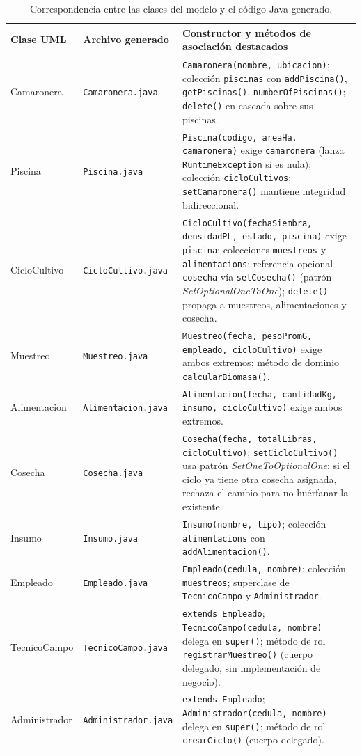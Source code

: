 \documentclass[11pt,a4paper]{article}
\begin{document}
\begin{table}[H]
  \centering
  \caption{Correspondencia entre las clases del modelo y el código Java generado.}
  \label{tab:correspondencia}
  \small
  \begin{tabular}{|l|l|p{6.3cm}|}
    \hline
    \textbf{Clase UML} & \textbf{Archivo generado} & \textbf{Constructor y métodos de asociación destacados} \\
    \hline
    Camaronera &
      \texttt{Camaronera.java} &
      \texttt{Camaronera(nombre, ubicacion)}; colección \texttt{piscinas} con \texttt{addPiscina()}, \texttt{getPiscinas()}, \texttt{numberOfPiscinas()}; \texttt{delete()} en cascada sobre sus piscinas. \\
    \hline
    Piscina &
      \texttt{Piscina.java} &
      \texttt{Piscina(codigo, areaHa, camaronera)} exige \texttt{camaronera} (lanza \texttt{RuntimeException} si es nula); colección \texttt{cicloCultivos}; \texttt{setCamaronera()} mantiene integridad bidireccional. \\
    \hline
    CicloCultivo &
      \texttt{CicloCultivo.java} &
      \texttt{CicloCultivo(fechaSiembra, densidadPL, estado, piscina)} exige \texttt{piscina}; colecciones \texttt{muestreos} y \texttt{alimentacions}; referencia opcional \texttt{cosecha} vía \texttt{setCosecha()} (patrón \emph{SetOptionalOneToOne}); \texttt{delete()} propaga a muestreos, alimentaciones y cosecha. \\
    \hline
    Muestreo &
      \texttt{Muestreo.java} &
      \texttt{Muestreo(fecha, pesoPromG, empleado, cicloCultivo)} exige ambos extremos; método de dominio \texttt{calcularBiomasa()}. \\
    \hline
    Alimentacion &
      \texttt{Alimentacion.java} &
      \texttt{Alimentacion(fecha, cantidadKg, insumo, cicloCultivo)} exige ambos extremos. \\
    \hline
    Cosecha &
      \texttt{Cosecha.java} &
      \texttt{Cosecha(fecha, totalLibras, cicloCultivo)}; \texttt{setCicloCultivo()} usa patrón \emph{SetOneToOptionalOne}: si el ciclo ya tiene otra cosecha asignada, rechaza el cambio para no huérfanar la existente. \\
    \hline
    Insumo &
      \texttt{Insumo.java} &
      \texttt{Insumo(nombre, tipo)}; colección \texttt{alimentacions} con \texttt{addAlimentacion()}. \\
    \hline
    Empleado &
      \texttt{Empleado.java} &
      \texttt{Empleado(cedula, nombre)}; colección \texttt{muestreos}; superclase de \texttt{TecnicoCampo} y \texttt{Administrador}. \\
    \hline
    TecnicoCampo &
      \texttt{TecnicoCampo.java} &
      \texttt{extends Empleado}; \texttt{TecnicoCampo(cedula, nombre)} delega en \texttt{super()}; método de rol \texttt{registrarMuestreo()} (cuerpo delegado, sin implementación de negocio). \\
    \hline
    Administrador &
      \texttt{Administrador.java} &
      \texttt{extends Empleado}; \texttt{Administrador(cedula, nombre)} delega en \texttt{super()}; método de rol \texttt{crearCiclo()} (cuerpo delegado). \\
    \hline
  \end{tabular}
\end{table}
\end{document}
